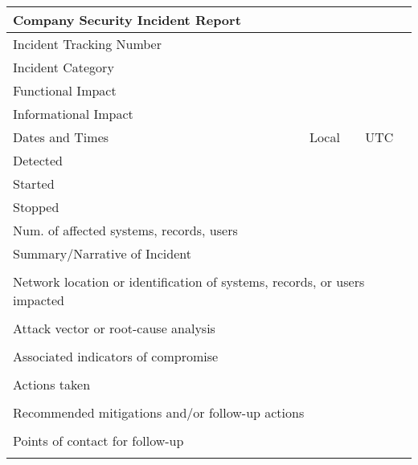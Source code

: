 \documentclass[../main.tex]{subfiles}
\begin{document}
\begin{tabular}{|p{9cm} | p{5cm} | p{5cm}|}
    \hline
    \multicolumn{3}{|l|}{Company Security Incident Report} \\
    \hline
    Incident Tracking Number & \multicolumn{2}{|p{10cm}|}{}\\
    \hline
    Incident Category & \multicolumn{2}{|p{10cm}|}{}\\
    \hline
    Functional Impact & \multicolumn{2}{|p{10cm}|}{}\\
    \hline
    Informational Impact & \multicolumn{2}{|p{10cm}|}{}\\
    \hline
    Dates and Times & Local & UTC \\
    \hline
    Detected & & \\
    \hline
    Started & & \\
    \hline
    Stopped & & \\
    \hline
    Num. of affected systems, records, users & \multicolumn{2}{|p{10cm}|}{} \\
    \hline
    \multicolumn{3}{|l|}{Summary/Narrative of Incident} \\
    \hline
    \multicolumn{3}{|l|}{\newline} \rule{0pt}{40pt}\\
    \hline
    \multicolumn{3}{|l|}{Network location or identification of systems, records, or users impacted } \\
    \hline
    \multicolumn{3}{|l|}{\newline} \rule{0pt}{40pt}\\
    \hline
    \multicolumn{3}{|l|}{Attack vector or root-cause analysis } \\
    \hline
    \multicolumn{3}{|l|}{\newline} \rule{0pt}{40pt}\\
    \hline
    \multicolumn{3}{|l|}{Associated indicators of compromise } \\
    \hline
    \multicolumn{3}{|l|}{\newline} \rule{0pt}{40pt}\\
    \hline
    \multicolumn{3}{|l|}{Actions taken} \\
    \hline
    \multicolumn{3}{|l|}{\newline} \rule{0pt}{40pt}\\
    \hline
    \multicolumn{3}{|l|}{Recommended mitigations and/or follow-up actions } \\
    \hline
    \multicolumn{3}{|l|}{\newline} \rule{0pt}{40pt}\\
    \multicolumn{3}{|l|}{Points of contact for follow-up  } \\
    \hline
    \multicolumn{3}{|l|}{\newline} \rule{0pt}{40pt}\\
    \hline
\end{tabular}
\restoregeometry
\end{document}
